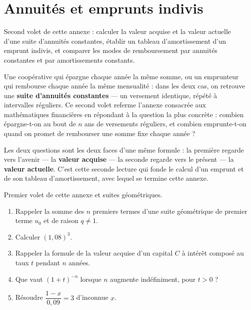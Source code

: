 \chapter{Annuités et emprunts indivis}

Second volet de cette annexe : calculer la valeur acquise et la valeur
actuelle d'une suite d'annuités constantes, établir un tableau
d'amortissement d'un emprunt indivis, et comparer les modes de remboursement
par annuités constantes et par amortissements constants.

Une coopérative qui épargne chaque année la même somme, ou un emprunteur qui
rembourse chaque année la même mensualité : dans les deux cas, on retrouve
une \textbf{suite d'annuités constantes} — un versement identique, répété à
intervalles réguliers. Ce second volet referme l'annexe consacrée aux
mathématiques financières en répondant à la question la plus concrète :
combien épargne-t-on au bout de $n$ ans de versements réguliers, et combien
emprunte-t-on quand on promet de rembourser une somme fixe chaque année ?

Les deux questions sont les deux faces d'une même formule : la première
regarde vers l'avenir — la \textbf{valeur acquise} — la seconde regarde vers
le présent — la \textbf{valeur actuelle}. C'est cette seconde lecture qui
fonde le calcul d'un emprunt et de son tableau d'amortissement, avec lequel
se termine cette annexe.

\begin{revision}
Premier volet de cette annexe et suites géométriques.

\begin{enumerate}[label=\textbf{\arabic*.}, leftmargin=*, itemsep=0.35em]
  \item Rappeler la somme des $n$ premiers termes d'une suite géométrique de
        premier terme $u_{0}$ et de raison $q \neq 1$.
  \item Calculer $(1{,}08)^{3}$.
  \item Rappeler la formule de la valeur acquise d'un capital $C$ à intérêt
        composé au taux $t$ pendant $n$ années.
  \item Que vaut $(1+t)^{-n}$ lorsque $n$ augmente indéfiniment, pour
        $t>0$ ?
  \item Résoudre $\dfrac{1-x}{0{,}09} = 3$ d'inconnue $x$.
\end{enumerate}
\end{revision}

